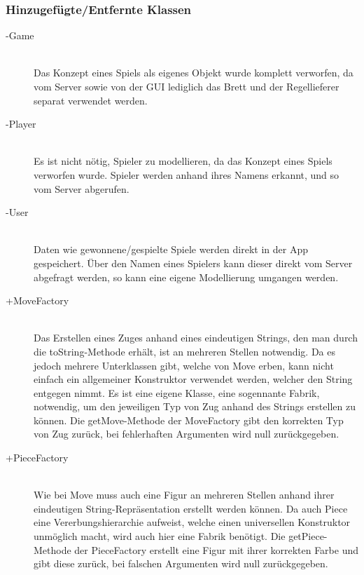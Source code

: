 \documentclass[parskip=full]{scrartcl}
\begin{document}
		\subsubsection{Hinzugefügte/Entfernte Klassen}
		\begin{description}
		
		\item[-Game]\hfill \\ Das Konzept eines Spiels als eigenes Objekt wurde komplett verworfen, da vom Server sowie von der GUI lediglich das Brett und der Regellieferer separat verwendet werden. 
		\item[-Player]\hfill \\ Es ist nicht nötig, Spieler zu modellieren, da das Konzept eines Spiels verworfen wurde. Spieler werden anhand ihres Namens erkannt, und so vom Server abgerufen.
		\item[-User]\hfill \\ Daten wie gewonnene/gespielte Spiele werden direkt in der App gespeichert. Über den Namen eines Spielers kann dieser direkt vom Server abgefragt werden, so kann eine eigene Modellierung umgangen werden.
		\item[+MoveFactory]\hfill \\ Das Erstellen eines Zuges anhand eines eindeutigen Strings, den man durch die toString-Methode erhält, ist an mehreren Stellen notwendig. Da es jedoch mehrere Unterklassen gibt, welche von Move erben, kann nicht einfach ein allgemeiner Konstruktor verwendet werden, welcher den String entgegen nimmt. Es ist eine eigene Klasse, eine sogennante Fabrik, notwendig, um den jeweiligen Typ von Zug anhand des Strings erstellen zu können. Die getMove-Methode der MoveFactory gibt den korrekten Typ von Zug zurück, bei fehlerhaften Argumenten wird null zurückgegeben.
		\item[+PieceFactory]\hfill \\ Wie bei Move muss auch eine Figur an mehreren Stellen anhand ihrer eindeutigen String-Repräsentation erstellt werden können. Da auch Piece eine Vererbungshierarchie aufweist, welche einen universellen Konstruktor unmöglich macht, wird auch hier eine Fabrik benötigt. Die getPiece-Methode der PieceFactory erstellt eine Figur mit ihrer korrekten Farbe und gibt diese zurück, bei falschen Argumenten wird null zurückgegeben.
		\end{description}
		
\end{document}

